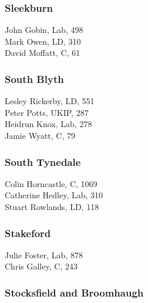 \documentclass[a4paper,openany,10pt]{book}
\begin{document}
\subsubsection*{Sleekburn}



John Gobin, Lab, 498\\
Mark Owen, LD, 310\\
David Moffatt, C, 61\\


\subsubsection*{South Blyth}



Lesley Rickerby, LD, 551\\
Peter Potts, UKIP, 287\\
Heidrun Knox, Lab, 278\\
Jamie Wyatt, C, 79\\


\subsubsection*{South Tynedale}



Colin Horncastle, C, 1069\\
Catherine Hedley, Lab, 310\\
Stuart Rowlands, LD, 118\\


\subsubsection*{Stakeford}



Julie Foster, Lab, 878\\
Chris Galley, C, 243\\


\subsubsection*{Stocksfield and Broomhaugh}

\end{document}
